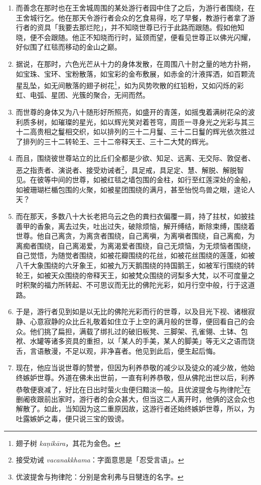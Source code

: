 \begin{enumerate}
\item 而善念在那时也在王舍城周围的某处游行者园中住了之后，为游行者围绕，在王舍城行乞。他在那天令游行者会众的乞食易得，吃了早餐，教游行者拿了游行者的资具「我要去那烂陀」，并不知晓世尊已行于此路而跟随。假如他知晓，便不会跟随。他正不知晓而行时，延颈而望，便看见世尊正以佛光闪耀，好似围了红毯而移动的金山之巅。
\item 据说，在那时，六色光芒从十力的身体发散，在周围八十肘之量的地方扑朔，如宝珠、宝环、宝粉散落，如宝彩的金布敷展，如赤金的汁液挥洒，如百颗流星乱坠，如无间散落的翅子树花\footnote{翅子树 \textit{kaṇikāra}，其花为金色。}，如为风势吹散的红铅粉，又如闪烁的彩虹、电弧、星团、光簇的聚合，无间而然。
\item 而世尊的身体又为八十随形好所照亮，如盛开的青莲，如摇曳着满树花朵的波利质多树，如璀璨的星光，如以辉光笑对着苍穹，周匝一寻身光之光彩与其三十二高贵相之鬘相交织，如以排列的三十二月鬘、三十二日鬘的辉光依次胜过了排列的三十二转轮王、三十二帝释天王、三十二大梵的辉光。
\item 而且，围绕彼世尊站立的比丘们全都是少欲、知足、远离、无交际、敦促者、恶之指责者、演说者、接受劝诫者\footnote{接受劝诫 \textit{vacanakkhama}：字面意思是「忍受言语」。}，具足戒，具足定、慧、解脱、解脱智见。在彼等中间的世尊，如被红毯之墙包围的金柱，如行至红莲深处的金船，如被珊瑚栏楯包围的火聚，如被星团围绕的满月，甚至怡悦鸟兽之眼，遑论人天？
\item 而在那天，多数八十大长老把乌云之色的粪扫衣偏覆一肩，持了拄杖，如披挂善甲的香象，离去过失，吐出过失，破除烦恼，解开缚结，断除束缚，围绕着世尊。他自己离贪，为离贪者围绕，自己离嗔，为离嗔者围绕，自己离痴，为离痴者围绕，自己离渴爱，为离渴爱者围绕，自己无烦恼，为无烦恼者围绕，自己觉悟，为随觉者围绕，如被花瓣围绕的花丝，如被花丝围绕的莲蓬，如被八千大象围绕的六牙象王，如被九万天鹅围绕的持国鹅王，如被军行围绕的转轮王，如被天众围绕的帝释天王，如被梵众围绕的诃梨多大梵，以不可度量之时积聚的福力所转起、不可思议而无比的佛陀光彩，如月行空中般，行于这道路。
\item 于是，游行者见到如是以无比的佛陀光彩而行的世尊，以及目光下视、诸根寂静、心意寂静的众比丘礼敬着如住立于上空的满月般的世尊，便回看自己的会众。他们挑了扁担，满载了绑扎过的破旧板凳、三脚架、孔雀翎、土钵、包袱、水罐等诸多资具的重担，以「某人的手美，某人的脚美」等无义之语而饶舌，言语散漫，不足以观，非净喜者。他见到此后，便生起后悔。
\item 现在，他应当说世尊的赞誉，但因为利养恭敬的减少以及徒众的减少故，他始终嫉妒世尊。外道在佛未出世前，一直有利养恭敬，但从佛陀出世以后，利养恭敬便衰减了，好比在日出时萤火虫便归黯淡一般。且优波提舍与拘律陀\footnote{优波提舍与拘律陀：分别是舍利弗与目犍连的名字。}在删阇夜跟前出家时，游行者的会众甚大，但当这二人离开时，他俩的这会众也解散了。如此，当知因为这二重原因故，这游行者还始终嫉妒世尊，所以，为吐露嫉妒之毒，便只说三宝的毁谤。\end{enumerate}

